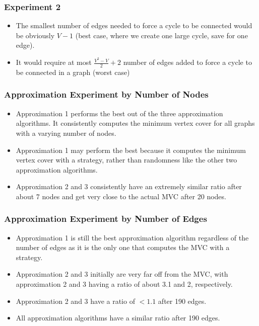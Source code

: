 \documentclass[12pt]{article}
\begin{document}
\subsubsection{Experiment 2}
\begin{itemize}
    \item The smallest number of edges needed to force a cycle to be connected would be obviously $V-1$ (best case, where we create one large cycle, save for one edge).
    \item It would require at most $\frac{V^2 - V}{2} + 2$ number of edges added to force a cycle to be connected in a graph (worst case) 
  \end{itemize}

  \subsubsection{Approximation Experiment by Number of Nodes}

  \begin{itemize}
      \item Approximation 1 performs the best out of the three approximation algorithms. It consistently computes the minimum vertex cover for all graphs with a varying number of nodes.
      \item Approximation 1 may perform the best because it computes the minimum vertex cover with a strategy, rather than randomness like the other two approximation algorithms.
      \item Approximation 2 and 3 consistently have an extremely similar ratio after about 7 nodes and get very close to the actual MVC after 20 nodes.
  \end{itemize}
  
\subsubsection{Approximation Experiment by Number of Edges}
  
  \begin{itemize}
      \item Approximation 1 is still the best approximation algorithm regardless of the number of edges as it is the only one that computes the MVC with a strategy.
      \item Approximation 2 and 3 initially are very far off from the MVC, with approximation 2 and 3 having a ratio of about 3.1 and 2, respectively.
      \item Approximation 2 and 3 have a ratio of $<1.1$ after 190 edges.
      \item All approximation algorithms have a similar ratio after 190 edges.
  \end{itemize}
  
\end{document}
